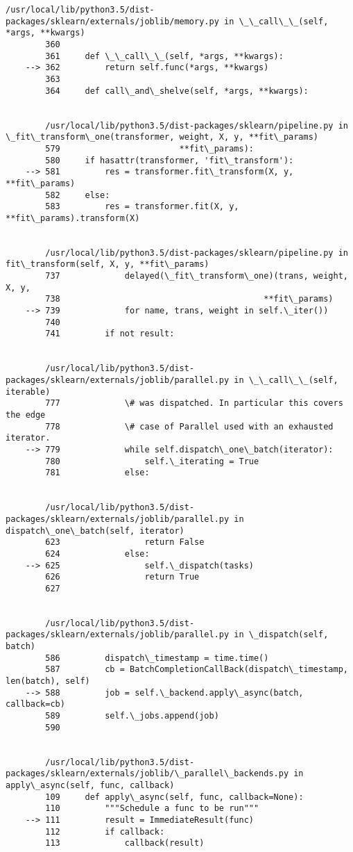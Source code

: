 \documentclass[11pt]{article}
\begin{document}
\begin{Verbatim}[commandchars=\\\{\}]
        /usr/local/lib/python3.5/dist-packages/sklearn/externals/joblib/memory.py in \_\_call\_\_(self, *args, **kwargs)
        360 
        361     def \_\_call\_\_(self, *args, **kwargs):
    --> 362         return self.func(*args, **kwargs)
        363 
        364     def call\_and\_shelve(self, *args, **kwargs):


        /usr/local/lib/python3.5/dist-packages/sklearn/pipeline.py in \_fit\_transform\_one(transformer, weight, X, y, **fit\_params)
        579                        **fit\_params):
        580     if hasattr(transformer, 'fit\_transform'):
    --> 581         res = transformer.fit\_transform(X, y, **fit\_params)
        582     else:
        583         res = transformer.fit(X, y, **fit\_params).transform(X)


        /usr/local/lib/python3.5/dist-packages/sklearn/pipeline.py in fit\_transform(self, X, y, **fit\_params)
        737             delayed(\_fit\_transform\_one)(trans, weight, X, y,
        738                                         **fit\_params)
    --> 739             for name, trans, weight in self.\_iter())
        740 
        741         if not result:


        /usr/local/lib/python3.5/dist-packages/sklearn/externals/joblib/parallel.py in \_\_call\_\_(self, iterable)
        777             \# was dispatched. In particular this covers the edge
        778             \# case of Parallel used with an exhausted iterator.
    --> 779             while self.dispatch\_one\_batch(iterator):
        780                 self.\_iterating = True
        781             else:


        /usr/local/lib/python3.5/dist-packages/sklearn/externals/joblib/parallel.py in dispatch\_one\_batch(self, iterator)
        623                 return False
        624             else:
    --> 625                 self.\_dispatch(tasks)
        626                 return True
        627 


        /usr/local/lib/python3.5/dist-packages/sklearn/externals/joblib/parallel.py in \_dispatch(self, batch)
        586         dispatch\_timestamp = time.time()
        587         cb = BatchCompletionCallBack(dispatch\_timestamp, len(batch), self)
    --> 588         job = self.\_backend.apply\_async(batch, callback=cb)
        589         self.\_jobs.append(job)
        590 


        /usr/local/lib/python3.5/dist-packages/sklearn/externals/joblib/\_parallel\_backends.py in apply\_async(self, func, callback)
        109     def apply\_async(self, func, callback=None):
        110         """Schedule a func to be run"""
    --> 111         result = ImmediateResult(func)
        112         if callback:
        113             callback(result)



\end{Verbatim}
\end{document}
